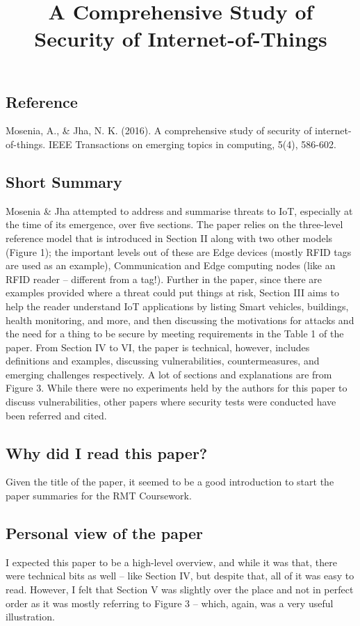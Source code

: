 \documentclass[11pt,a4paper]{article}
\title{A Comprehensive Study of Security of Internet-of-Things}
\author{}
\date{}
\begin{document}
\maketitle

\subsection*{Reference}
Mosenia, A., \& Jha, N. K. (2016). A comprehensive study of security of internet-of-things. IEEE Transactions on emerging topics in computing, 5(4), 586-602.

\subsection*{Short Summary} 
Mosenia \& Jha attempted to address and summarise threats to IoT, especially at the time of its emergence, over five sections. The paper relies on the three-level reference model that is introduced in Section II along with two other models (Figure 1); the important levels out of these are Edge devices (mostly RFID tags are used as an example), Communication and Edge computing nodes (like an RFID reader – different from a tag!). Further in the paper, since there are examples provided where a threat could put things at risk, Section III aims to help the reader understand IoT applications by listing Smart vehicles, buildings, health monitoring, and more, and then discussing the motivations for attacks and the need for a thing to be secure by meeting requirements in the Table 1 of the paper. From Section IV to VI, the paper is technical, however, includes definitions and examples, discussing vulnerabilities, countermeasures, and emerging challenges respectively. A lot of sections and explanations are from Figure 3. While there were no experiments held by the authors for this paper to discuss vulnerabilities, other papers where security tests were conducted have been referred and cited.

\subsection*{Why did I read this paper?}
Given the title of the paper, it seemed to be a good introduction to start the paper summaries for the RMT Coursework. 

\subsection*{Personal view of the paper}
I expected this paper to be a high-level overview, and while it was that, there were technical bits as well – like Section IV, but despite that, all of it was easy to read. However, I felt that Section V was slightly over the place and not in perfect order as it was mostly referring to Figure 3 – which, again, was a very useful illustration. 
\end{document}
